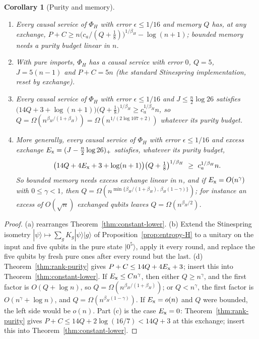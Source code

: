 \documentclass[11pt,a4paper]{article}
\theoremstyle{plain}
\newtheorem{corollary}[theorem]{Corollary}
\theoremstyle{definition}
\theoremstyle{remark}
\begin{document}


\begin{corollary}[Purity and memory]\label{cor:purity}
\begin{enumerate}[label=(\alph*)]
\item Every causal service of $\Phi_H$ with error $\epsilon\le1/16$ and memory $Q$ has, at any exchange,
$P+C\ge n\big(c_a/(Q+\frac18)\big)^{1/\beta_H}-\log(n+1)$; bounded memory needs a purity budget linear in $n$.
\item With pure imports, $\Phi_H$ has a causal service with error $0$, $Q=5$, $J=5(n-1)$ and $P+C=5n$ (the standard Stinespring
implementation, reset by exchange).
\item Every causal service of $\Phi_H$ with error $\epsilon\le1/16$ and $J\le\frac n2\log26$ satisfies
$\big(14Q+3+\log(n+1)\big)\big(Q+\frac18\big)^{1/\beta_H}\ge c_a^{1/\beta_H}n$, so $Q=\Omega(n^{\beta_H/(1+\beta_H)})=\Omega(n^{1/(2\log107+2)})$
whatever its purity budget.
\item More generally, every causal service of $\Phi_H$ with error $\epsilon\le1/16$ and excess exchange $E_{\rm x}=(J-\frac n2\log26)_+$ satisfies, whatever
its purity budget,
\[
\big(14Q+4E_{\rm x}+3+\log(n+1)\big)\big(Q+\tfrac18\big)^{1/\beta_H}\ \ge\ c_a^{1/\beta_H}n .
\]
So bounded memory needs excess exchange linear in $n$, and if $E_{\rm x}=O(n^\gamma)$ with $0\le\gamma<1$, then
$Q=\Omega(n^{\min\{\beta_H/(1+\beta_H),\,\beta_H(1-\gamma)\}})$; for instance an excess of $O(\sqrt n)$ exchanged qubits leaves $Q=\Omega(n^{\beta_H/2})$.
\end{enumerate}
\end{corollary}

\begin{proof}
(a) rearranges Theorem~\ref{thm:constant-lower}. (b) Extend the Stinespring isometry $|\psi\rangle\mapsto\sum_gK_g|\psi\rangle|g\rangle$ of
Proposition~\ref{prop:entropy-H} to a unitary on the input and five qubits in the pure state $|0^5\rangle$, apply it every round, and
replace the five qubits by fresh pure ones after every round but the last. (d) Theorem~\ref{thm:rank-purity} gives
$P+C\le14Q+4E_{\rm x}+3$; insert this into Theorem~\ref{thm:constant-lower}. If $E_{\rm x}\le Cn^\gamma$, then either $Q\ge n^\gamma$, and the first factor is
$O(Q+\log n)$, so $Q=\Omega(n^{\beta_H/(1+\beta_H)})$; or $Q<n^\gamma$, the first factor is $O(n^\gamma+\log n)$, and $Q=\Omega(n^{\beta_H(1-\gamma)})$. If
$E_{\rm x}=o(n)$ and $Q$ were bounded, the left side would be $o(n)$. Part (c) is the case $E_{\rm x}=0$: Theorem~\ref{thm:rank-purity} gives $P+C\le14Q+2\log(16/7)<14Q+3$ at this exchange; insert this into
Theorem~\ref{thm:constant-lower}.
\end{proof}
\end{document}
